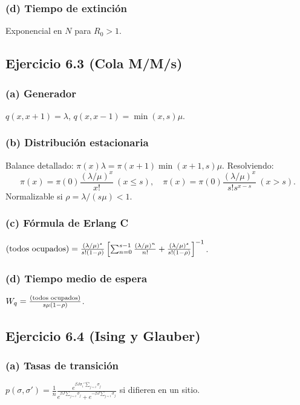 \documentclass[12pt]{article}
\let\P\relax
\newcommand{\P}{\mathbb{P}}
\newcommand{\1}{\mathbf{1}}
\begin{document}
\subsubsection*{(d) Tiempo de extinci\'on}
Exponencial en $N$ para $R_0>1$.

\subsection{Ejercicio 6.3 (Cola M/M/s)}

\subsubsection*{(a) Generador}
$q(x,x+1)=\lambda$, $q(x,x-1)=\min(x,s)\mu$.

\subsubsection*{(b) Distribuci\'on estacionaria}
Balance detallado: $\pi(x)\lambda=\pi(x+1)\min(x+1,s)\mu$. Resolviendo:
\[
\pi(x)=\pi(0)\frac{(\lambda/\mu)^x}{x!}\ (x\le s),\quad \pi(x)=\pi(0)\frac{(\lambda/\mu)^x}{s!s^{x-s}}\ (x>s).
\]
Normalizable si $\rho=\lambda/(s\mu)<1$.

\subsubsection*{(c) F\'ormula de Erlang C}
$\P(\text{todos ocupados})=\frac{(\lambda/\mu)^s}{s!(1-\rho)}\left[\sum_{n=0}^{s-1}\frac{(\lambda/\mu)^n}{n!}+\frac{(\lambda/\mu)^s}{s!(1-\rho)}\right]^{-1}$.

\subsubsection*{(d) Tiempo medio de espera}
$W_q=\frac{\P(\text{todos ocupados})}{s\mu(1-\rho)}$.

\subsection{Ejercicio 6.4 (Ising y Glauber)}

\subsubsection*{(a) Tasas de transici\'on}
$p(\sigma,\sigma')=\frac1n\frac{e^{\beta J\sigma_i'\sum_{j\sim i}\sigma_j}}{e^{\beta J\sum_{j\sim i}\sigma_j}+e^{-\beta J\sum_{j\sim i}\sigma_j}}$ si difieren en un sitio.
\end{document}
